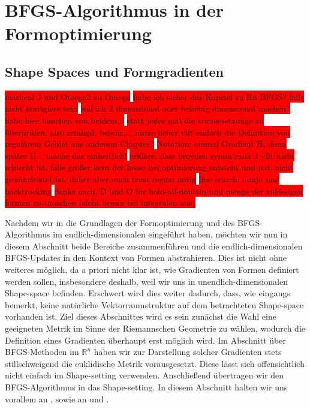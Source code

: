 
\section{BFGS-Algorithmus in der Formoptimierung}
\subsection{Shape Spaces und Formgradienten}
\label{Chap_shapespaces}

\colorbox{red}{mathcal J und Omega2 zu Omega}
\colorbox{red}{habe ich sicher das Kapitel zu Rn BFGS? falls nicht korrigiere text}
\colorbox{red}{soll ich 2 dimensional oder beliebig dimensional machen? habe hier bisschen von beidem...}
\colorbox{red}{ statt jedes mal die voraussetzunge zu überprüfen, also zsmhgd, beschr,... nutze lieber vllt einfach die Definition von regulärem Gebiet aus anderem Chapter?}
\colorbox{red}{Notation: einmal Gradient H, dann später U... mache das einheitlich!}
\colorbox{red}{erkläre, dass broyden symm rank 1 vllt nicht schlecht ist, falls großer kern der hesse bei optimierung entsteht und p.d. nicht gewährleistet ist,
daher aber auch trust region nötig}
\colorbox{red}{line search: amijo und backtracking}
\colorbox{red}{denke nach, D und O für hold-all-domain und menge der zulässigen formen zu tauschen (sieht besser bei integralen aus)}


Nachdem wir in die Grundlagen der Formoptimierung und des BFGS-Algorithmus im endlich-dimensionalen eingeführt haben, möchten wir nun in diesem Abschnitt beide Bereiche zusammenführen und die endlich-dimensionalen BFGS-Updates in den Kontext von Formen abstrahieren. Dies ist nicht ohne weiteres möglich, da a priori nicht klar ist, wie Gradienten von Formen definiert werden sollen, insbesondere deshalb, weil wir uns in unendlich-dimensionalen Shape-space befinden. Erschwert wird dies weiter dadurch, dass, wie eingangs bemerkt, keine natürliche Vektorraumstruktur auf dem betrachteten Shape-space vorhanden ist. Ziel dieses Abschnittes wird es sein zunächst die Wahl eine geeigneten Metrik im Sinne der Riemannschen Geometrie zu wählen, wodurch die Definition eines Gradienten überhaupt erst möglich wird. Im Abschnitt über BFGS-Methoden im $\mathbb{R}^n$ haben wir zur Darstellung solcher Gradienten stets stillschweigend die euklidische Metrik vorausgesetzt. Diese lässt sich offensichtlich nicht einfach im Shape-setting verwenden. Anschließend übertragen wir den BFGS-Algorithmus in das Shape-setting. In diesem Abschnitt halten wir uns vorallem an \cite{bfgs1}, sowie an \cite{shape_space} und \cite{bfgs2}.

